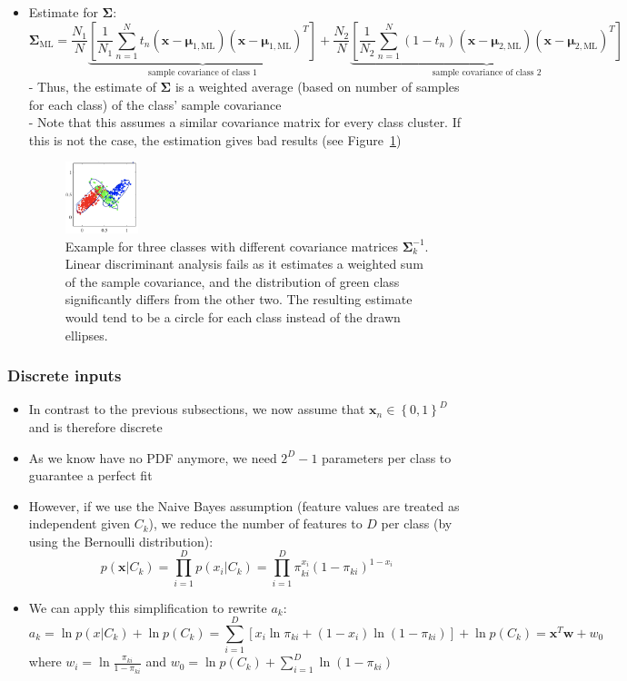 \begin{itemize}
	\item Estimate for $\bm{\Sigma}$: 
	$$\bm{\Sigma}_{\text{ML}} = \frac{N_1}{N}\underbrace{\left[\frac{1}{N_1} \sum\limits_{n=1}^{N} t_n\left(\bm{x} - \bm{\mu}_{1,\text{ML}}\right)\left(\bm{x} - \bm{\mu}_{1,\text{ML}}\right)^T\right]}_{\text{sample covariance of class 1}} + \frac{N_2}{N}\underbrace{\left[\frac{1}{N_2} \sum\limits_{n=1}^{N} (1-t_n)\left(\bm{x} - \bm{\mu}_{2,\text{ML}}\right)\left(\bm{x} - \bm{\mu}_{2,\text{ML}}\right)^T\right]}_{\text{sample covariance of class 2}}$$
	- Thus, the estimate of $\bm{\Sigma}$ is a weighted average (based on number of samples for each class) of the class' sample covariance\\
	- Note that this assumes a similar covariance matrix for every class cluster. If this is not the case, the estimation gives bad results (see Figure~\ref{img:linear_discriminative_analysis_different_cov})
	\begin{figure}[ht]
		\centering
		\includegraphics[width=0.2\textwidth]{figures/linear_discriminant_analysis_different_cov.png}
		\caption{Example for three classes with different covariance matrices $\bm{\Sigma}_k^{-1}$. Linear discriminant analysis fails as it estimates a weighted sum of the sample covariance, and the distribution of green class significantly differs from the other two. The resulting estimate would tend to be a circle for each class instead of the drawn ellipses.}
		\label{img:linear_discriminative_analysis_different_cov}
	\end{figure}
\end{itemize}
\subsubsection{Discrete inputs}
\begin{itemize}
	\item In contrast to the previous subsections, we now assume that $\bm{x}_n \in\left\{0,1\right\}^D$ and is therefore discrete
	\item As we know have no PDF anymore, we need $2^D - 1$ parameters per class to guarantee a perfect fit
	\item However, if we use the Naive Bayes assumption (feature values are treated as independent given $C_k$), we reduce the number of features to $D$ per class (by using the Bernoulli distribution):
	$$p\left(\bm{x}|C_k\right) = \prod\limits_{i=1}^{D}p\left(x_i|C_k\right) = \prod\limits_{i=1}^{D} \pi_{ki}^{x_i}\left(1 - \pi_{ki}\right)^{1-x_i}$$
	\item We can apply this simplification to rewrite $a_k$:
	$$a_k = \ln p\left(x|C_k\right) + \ln p\left(C_k\right)  = \sum\limits_{i=1}^{D}\left[x_i\ln \pi_{ki} + (1 - x_i)\ln (1 - \pi_{ki}) \right] + \ln p\left(C_k\right) = \bm{x}^T\bm{w} + w_0 $$
	 where $w_i=\ln \frac{\pi_{ki}}{1 - \pi_{ki}}$ and $w_0 = \ln p\left(C_k\right) + \sum_{i=1}^{D}\ln \left(1-\pi_{ki}\right)$ 
\end{itemize}
